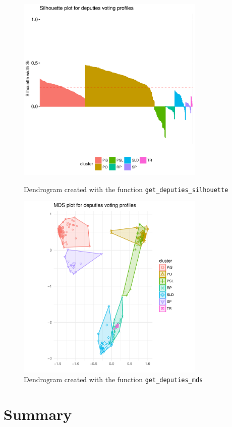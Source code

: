 \begin{figure}[htbp]
  \centering
  \includegraphics[width=0.8\textwidth]{ggsilhouette01}
  \caption{Dendrogram created with the function \texttt{get\_deputies\_silhouette}}
  \label{figure:ggsilhouette}
  \includegraphics[width=0.8\textwidth]{ggmds01}
  \caption{Dendrogram created with the function \texttt{get\_deputies\_mds}}
  \label{figure:ggmds}
\end{figure}

\section{Summary}


